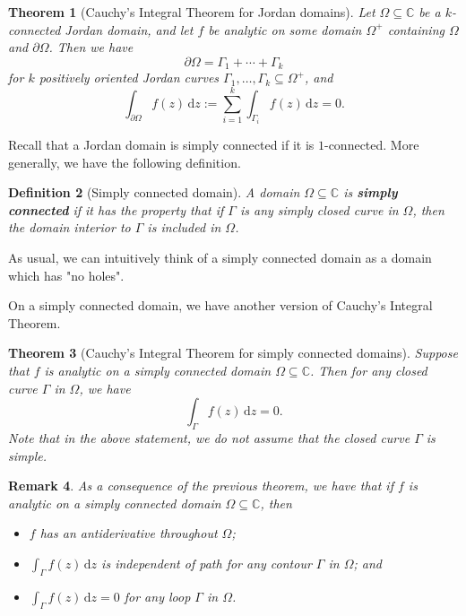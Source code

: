\documentclass[10pt]{article}
\newcommand{\C}{\mathbb{C}}
\newcommand{\dd}{\,\mathrm{d}}
\theoremstyle{newstyle}
\newtheorem{thm}{Theorem}[section]
\newtheorem{remark}[thm]{Remark}
\newtheorem{defn}[thm]{Definition}
\begin{document}
\begin{thm}[Cauchy's Integral Theorem for Jordan domains]
Let $\Omega \subseteq \C$ be a $k$-connected Jordan domain, and let $f$ be analytic 
on some domain $\Omega^+$ containing $\Omega$ and $\partial\Omega$. Then we have 
\[ \partial\Omega = \Gamma_1 + \cdots + \Gamma_k \]
for $k$ positively oriented Jordan curves $\Gamma_1, \dots, \Gamma_k \subseteq \Omega^+$, and 
\[ \int_{\partial\Omega} f(z)\dd z := \sum_{i=1}^k \int_{\Gamma_i} f(z)\dd z = 0. \]
\end{thm}

Recall that a Jordan domain is simply connected if it is $1$-connected. More generally, we have 
the following definition. 

\begin{defn}[Simply connected domain]
A domain $\Omega \subseteq \C$ is {\bf simply connected} if it has the property that 
if $\Gamma$ is any simply closed curve in $\Omega$, then the domain interior to 
$\Gamma$ is included in $\Omega$. 
\end{defn}

As usual, we can intuitively think of a simply connected domain as a domain which has "no holes". 

On a simply connected domain, we have another version of Cauchy's Integral Theorem. 

\begin{thm}[Cauchy's Integral Theorem for simply connected domains]
Suppose that $f$ is analytic on a simply connected domain $\Omega \subseteq \C$. Then for 
any closed curve $\Gamma$ in $\Omega$, we have 
\[ \int_\Gamma f(z)\dd z = 0. \]
Note that in the above statement, we do not assume that the closed curve $\Gamma$ is simple.
\end{thm}

\begin{remark}
As a consequence of the previous theorem, 
we have that if $f$ is analytic on a simply connected domain $\Omega \subseteq \C$, then
\begin{itemize}
    \item $f$ has an antiderivative throughout $\Omega$;
    \item $\int_\Gamma f(z)\dd z$ is independent of path for any contour $\Gamma$ in $\Omega$; and 
    \item $\int_\Gamma f(z)\dd z = 0$ for any loop $\Gamma$ in $\Omega$. 
\end{itemize}
\end{remark}
\end{document}
